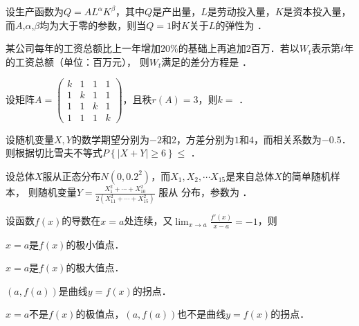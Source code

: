\documentclass[plain,noanswer,medmath]{../../template/jnuexam}
\begin{document}






\begin{problem}
设生产函数为$Q = AL^{\alpha}K^{\beta}$，其中$Q$是产出量，$L$是劳动投入量，$K$是资本投入量，
而$A$,$\alpha$,$\beta$均为大于零的参数，则当$Q = 1$时$K$关于$L$的弹性为 \fillin{}．
\end{problem}


\begin{problem}
某公司每年的工资总额比上一年增加$20\%$的基础上再追加$2$百万．若以$W_t$表示第$t$年的工资总额（单位：百万元），
则$W_t$满足的差分方程是 \fillin{}．
\end{problem}


\begin{problem}
设矩阵$A = \begin{pmatrix}
  k & 1 & 1 & 1 \\
  1 & k & 1 & 1 \\
  1 & 1 & k & 1 \\
  1 & 1 & 1 & k
\end{pmatrix}$，且秩$r(A) = 3$，则$k =$ \fillin{}．
\end{problem}


\begin{problem}
设随机变量$X,Y$的数学期望分别为$- 2$和$2$，方差分别为$1$和$4$，而相关系数为$- 0.5$．
则根据切比雪夫不等式$P\left\{\left| X + Y \right| \ge 6 \right\} \le$ \fillin{}．
\end{problem}


\begin{problem}
设总体$X$服从正态分布$N(0,0.2^2)$，而$X_1,X_2, \cdots X_{15}$是来自总体$X$的简单随机样本，
则随机变量$Y = \frac{X_1^2 + \cdots + X_{10}^2}{2\left(X_{11}^2 + \cdots + X_{15}^2 \right)}$
服从 \fillin{} 分布，参数为 \fillin{}．
\end{problem}




\begin{problem}
设函数$f(x)$的导数在$x = a$处连续，又$\lim_{x \to a} \frac{f'(x)}{x - a} = - 1$，则\pickout{}
\begin{abcd}
\item $x = a$是$f(x)$的极小值点．
\item $x = a$是$f(x)$的极大值点．
\item $(a,f(a))$是曲线$y = f(x)$的拐点．
\item $x = a$不是$f(x)$的极值点，$(a,f(a))$也不是曲线$y = f(x)$的拐点．
\end{abcd}
\end{problem}
\end{document}
